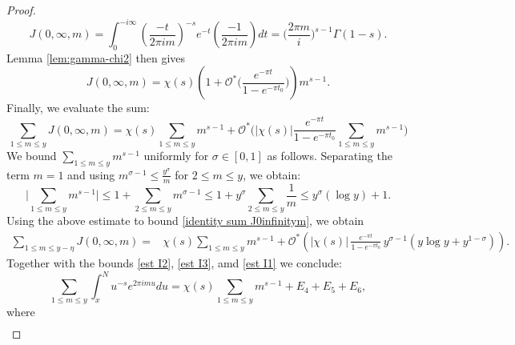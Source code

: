 \documentclass[11pt,letterpaper,oneside,reqno]{amsart}
\renewcommand{\^}[1]{\widehat{#1}}
\numberwithin{equation}{section}
\theoremstyle{remark}
\begin{document}
\begin{proof}
\begin{equation}
J(0,\infty,m) = \int_{0}^{-i\infty} \left(\frac{-t}{2\pi i m}\right)^{-s} e^{-t} \left(\frac{-                                           1}{2\pi i m}\right) dt  
 = \bigg(\frac{2\pi m}{i}\bigg)^{s-1}\Gamma(1-s). \label{I1 1.1}
 \end{equation}
Lemma \ref{lem:gamma-chi2} then gives
 \begin{equation} \label{new I1}
   J(0,\infty,m) %
   = \chi(s) \left(1 + \mathcal{O}^* \bigg(\dfrac{ e^{-\pi t} }{1 - e^{-\pi t_0}}\bigg)\right) m^{s-1}. 
 \end{equation}
Finally, we evaluate the sum: 
\begin{equation} \label{identity sum J0infinitym}
    \sum_{1 \leq m \leq y} J(0,\infty,m) 
    = %
    \chi(s) \sum_{1 \leq m \leq y} m^{s-1} 
    + \mathcal{O}^* \bigg(|\chi(s)| \frac{e^{-\pi t}}{1 - e^{-\pi t_0}} \sum_{1 \leq m \leq y} m^{s-1} \bigg)
\end{equation}
We bound $\sum_{1 \leq m \leq y} m^{s-1}$ uniformly for $\sigma\in[0,1]$ as follows. 
Separating the term $m=1$ and using 
$m^{\sigma - 1} %
\leq \frac{y^\sigma}{m}$ for $2 \leq m \leq y$, we obtain:
\begin{equation}
\bigg|\sum_{1 \leq m \leq y} m^{s-1} \bigg| 
\leq %
1 + \sum_{2 \leq m \leq y} m^{\sigma-1} 
\leq 1 + y^\sigma \sum_{2 \leq m \leq y} \frac{1}{m} \leq y^\sigma (\log y) + 1.
\end{equation}
Using the above estimate to bound \eqref{identity sum J0infinitym}, we obtain 
 \begin{equation}\label{est I1}
  \begin{split}   \sum_{1 \leq m \leq y-\eta} J(0,\infty,m) = & \chi(s) \sum_{1 \leq m \leq y} m^{s-1} +\mathcal{O}^* \left( |\chi(s)| \,  \frac{e^{-\pi t}}{1 - e^{-\pi t_0}}\, y^{\sigma-1} \left( y\log y + y^{1-\sigma}  \right) \right).
 \end{split}\end{equation}
Together with the bounds \eqref{est I2}, \eqref{est I3}, amd \eqref{est I1} we conclude:
\begin{equation}
   \sum_{1\leq m \leq y }\int_x^N u^{-s}e^{2 \pi i m u} du=
   \chi(s) \sum_{1 \leq m \leq y} m^{s-1} +E_{4}+E_{5}+E_{6},\label{4.59}
\end{equation}
where 
\begin{align}
& \label{def-E45}

\end{align}
\end{proof}
\end{document}
